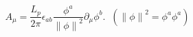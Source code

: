 \begin{equation}
A_\mu =\frac{L_p}{2\pi }\epsilon _{ab}\frac{\phi ^a}{\left\| \phi \right\| ^2%
}\partial _\mu \phi ^b.\;\;(\left\| \phi \right\| ^2=\phi ^a\phi ^a)
\end{equation}

